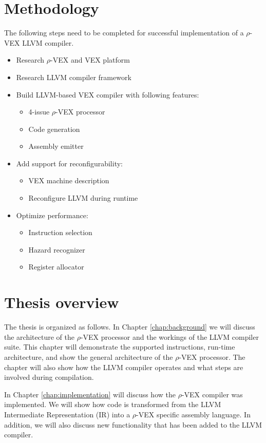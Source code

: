 \section{Methodology}
The following steps need to be completed for successful implementation of a $\rho$-VEX LLVM compiler.
\begin{itemize}
	\item Research $\rho$-VEX and VEX platform
	\item Research LLVM compiler framework
	\item Build LLVM-based VEX compiler with following features:
	\begin{itemize}
		\item 4-issue $\rho$-VEX processor
		\item Code generation
		\item Assembly emitter
	\end{itemize}
	\item Add support for reconfigurability:
		\begin{itemize}
			\item VEX machine description
			\item Reconfigure LLVM during runtime
		\end{itemize}	
	\item Optimize performance:
	\begin{itemize}
		\item Instruction selection
		\item Hazard recognizer
		\item Register allocator
	\end{itemize}	
\end{itemize}




\section{Thesis overview}
The thesis is organized as follows. 
In Chapter \ref{chap:background} we will discuss the architecture of the $\rho$-VEX processor and the workings of the LLVM compiler suite. This chapter will demonstrate the supported instructions, run-time architecture, and show the general architecture of the $\rho$-VEX processor. The chapter will also show how the LLVM compiler operates and what steps are involved during compilation.

In Chapter \ref{chap:implementation} will discuss how the $\rho$-VEX compiler was implemented. We will show how code is transformed from the LLVM Intermediate Representation (IR) into a $\rho$-VEX specific assembly language. In addition, we will also discuss new functionality that has been added to the LLVM compiler.

